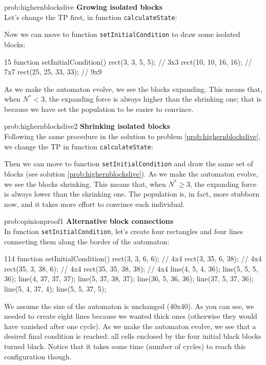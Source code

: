 \begin{sol}{prob:highernblockslive}
\textbf{Growing isolated blocks}\\
Let's change the TP first, in function \texttt{calculateState}:
\begin{codeh1}{1}{3}
function calculateState(state, neighSum) {
  const N = 2; // Turning Point
\end{codeh1}
Now we can move to function \texttt{setInitialCondition} to draw some isolated blocks:
\begin{codeh1}{1}{5}
function setInitialCondition() {
  rect(3, 3, 5, 5); // 3x3
  rect(10, 10, 16, 16); // 7x7
  rect(25, 25, 33, 33); // 9x9
}
\end{codeh1}
As we make the automaton evolve, we see the blocks expanding. This means that, when $N^\ast < 3$, the
expanding force is always higher than the shrinking one; that is because we have set the population to
be easier to convince.
\end{sol}

\begin{sol}{prob:highernblockslive2}
\textbf{Shrinking isolated blocks}\\
Following the same procedure in the solution to problem \ref{prob:highernblockslive}, we change the TP
in function \texttt{calculateState}:
\begin{codeh1}{1}{3}
function calculateState(state, neighSum) {
  const N = 4; // Turning Point
\end{codeh1}
Then we can move to function \texttt{setInitialCondition} and draw the same set of blocks (see 
solution \ref{prob:highernblockslive}).
As we make the automaton evolve, we see the blocks shrinking. This means that, when $N^\ast \geq 3$, the
expanding force is always lower than the shrinking one. The population is, in fact, more stubborn now, and
it takes more effort to convince each individual.
\end{sol}

\begin{sol}{prob:opinionproof1}
\textbf{Alternative block connections}\\
In function \texttt{setInitialCondition}, let's create four rectangles and four lines connecting them along
the border of the automaton:
\begin{codeh1}{1}{14}
function setInitialCondition() {
  rect(3, 3, 6, 6); // 4x4
  rect(3, 35, 6, 38); // 4x4
  rect(35, 3, 38, 6); // 4x4
  rect(35, 35, 38, 38); // 4x4
  line(4, 5, 4, 36);
  line(5, 5, 5, 36);
  line(4, 37, 37, 37);
  line(5, 37, 38, 37);
  line(36, 5, 36, 36);
  line(37, 5, 37, 36);
  line(5, 4, 37, 4);
  line(5, 5, 37, 5);
}
\end{codeh1}
We assume the size of the automaton is unchanged (40x40). As you can see, we needed to create eight lines
because we wanted thick ones (otherwise they would have vanished after one cycle). As we make the
automaton evolve, we see that a desired final condition is reached: all cells enclosed by the four
initial black blocks turned black.
Notice that it takes some time (number of cycles) to reach this configuration though.
\end{sol}
